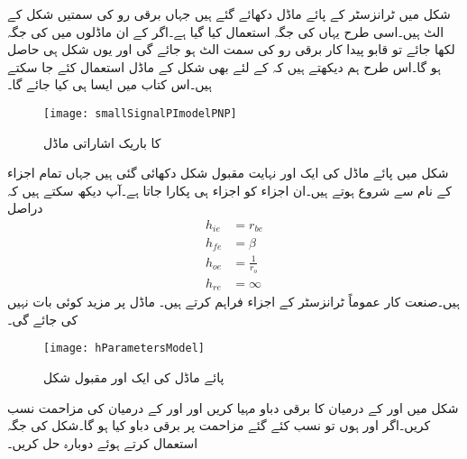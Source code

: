 شکل  میں  ٹرانزسٹر کے پائے ماڈل دکھائے گئے ہیں جہاں برقی رو کی سمتیں  شکل  کے الٹ ہیں۔اسی طرح یہاں  کی جگہ  استعمال کیا گیا ہے۔اگر  کے ان ماڈلوں میں  کی جگہ  لکھا جائے تو قابو پیدا کار برقی رو کی سمت الٹ ہو جائے گی اور  یوں شکل  ہی حاصل ہو گا۔اس طرح ہم دیکھتے ہیں کہ  کے لئے بھی شکل  کے ماڈل استعمال کئے جا سکتے ہیں۔اس کتاب میں ایسا ہی کیا جائے گا۔
\begin{figure}
\centering
\texttt{[image: smallSignalPImodelPNP]}
\caption{ کا باریک اشاراتی  ماڈل}
\label{شکل_باریک_اشاراتی_پائے_ماڈل_الف}
\end{figure}
%
شکل  میں پائے ماڈل کی ایک اور نہایت مقبول شکل دکھائی گئی ہیں جہاں تمام اجزاء کے نام  سے شروع ہوتے ہیں۔ان اجزاء کو  اجزاء ہی پکارا جاتا ہے۔آپ دیکھ سکتے ہیں کہ دراصل
\begin{align*}
h_{ie}&=r_{be}\\
h_{fe}&=\beta\\
h_{oe}&=\frac{1}{r_o}\\
h_{re}&=\infty
\end{align*}
ہیں۔صنعت کار عموماً ٹرانزسٹر کے  اجزاء فراہم کرتے ہیں۔ ماڈل پر مزید کوئی بات نہیں کی جائے گی۔

% 
\begin{figure}
\centering
\texttt{[image: hParametersModel]}
\caption{پائے ماڈل کی ایک اور مقبول شکل}
\label{شکل_باریک_اشاراتی_ایچ_پارامیٹر_پائے_ماڈل}
\end{figure}
شکل  میں  اور  کے درمیان  کا برقی دباو مہیا کریں اور  اور  کے درمیان  کی مزاحمت نسب کریں۔اگر  اور  ہوں تو نسب کئے گئے مزاحمت پر برقی دباو کیا ہو گا۔شکل  کی جگہ  استعمال کرتے ہوئے دوبارہ حل کریں۔

